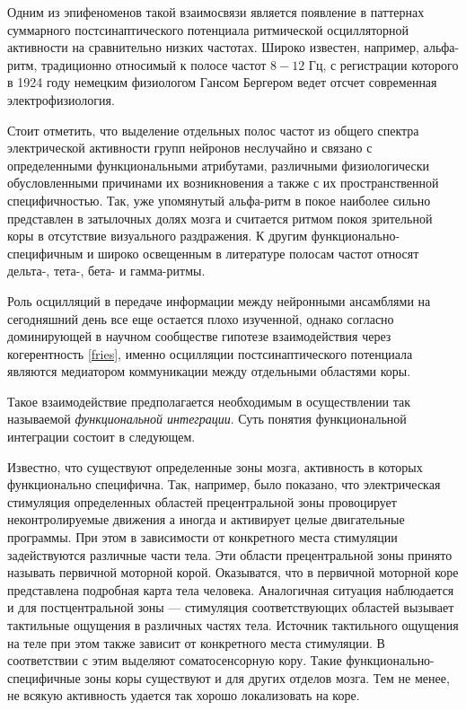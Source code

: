 Одним из эпифеноменов такой взаимосвязи является появление в паттернах суммарного постсинаптического
потенциала ритмической осцилляторной активности на сравнительно низких частотах.
Широко известен, например, альфа-ритм, традиционно относимый к полосе частот $8-12$ Гц,
с регистрации которого в 1924 году немецким физиологом Гансом Бергером ведет отсчет
современная электрофизиология.

Стоит отметить, что выделение отдельных полос частот из общего спектра электрической активности
групп нейронов неслучайно и связано с определенными функциональными атрибутами, различными
физиологически обусловленными причинами их возникновения а также с их пространственной специфичностью.
Так, уже упомянутый альфа-ритм в покое наиболее сильно представлен в затылочных долях мозга
и считается ритмом покоя зрительной коры в отсутствие визуального раздражения.
К другим функционально-специфичным и широко освещенным в литературе полосам частот
относят дельта-, тета-, бета- и гамма-ритмы.


Роль осцилляций в передаче информации между нейронными ансамблями на сегодняшний день
все еще остается плохо изученной, однако согласно доминирующей в научном сообществе
гипотезе взаимодействия через когерентность \ref{fries}, именно осцилляции постсинаптического
потенциала являются медиатором коммуникации между отдельными областями коры.

Такое взаимодействие предполагается необходимым в осуществлении так называемой
\emph{функциональной интеграции}. Суть понятия функциональной интеграции состоит в следующем.

Известно, что существуют определенные зоны мозга, активность в которых функционально специфична.
Так, например, было показано, что электрическая стимуляция определенных областей
прецентральной зоны провоцирует неконтролируемые движения а иногда и активирует целые двигательные программы.
При этом в зависимости от конкретного места стимуляции задействуются различные части тела.
Эти области прецентральной зоны принято называть первичной моторной корой.
Оказыватся, что в первичной моторной коре представлена подробная карта тела человека.
Аналогичная ситуация наблюдается и для постцентральной зоны --- стимуляция соответствующих
областей вызывает тактильные ощущения в различных частях тела. Источник тактильного ощущения
на теле при этом также зависит от конкретного места стимуляции. В соответствии с этим выделяют
соматосенсорную кору. Такие функционально-специфичные зоны коры существуют и для других отделов
мозга. Тем не менее, не всякую активность удается так хорошо локализовать на коре.

